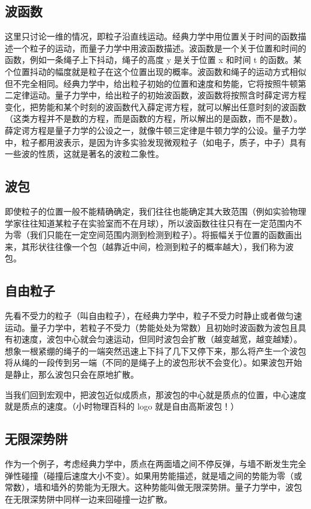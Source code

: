 ﻿\subsection{波函数}
这里只讨论一维的情况，即粒子沿直线运动。经典力学中用位置关于时间的函数描述一个粒子的运动，而量子力学中用波函数描述。波函数是一个关于位置和时间的函数，例如一条绳子上下抖动，绳子的高度 y 是关于位置 x 和时间 t 的函数。某个位置抖动的幅度就是粒子在这个位置出现的概率。波函数和绳子的运动方式相似但不完全相同。经典力学中，给出粒子初始的位置和速度和势能，它将按照牛顿第二定律运动。量子力学中，给出粒子的初始波函数，波函数将按照含时薛定谔方程变化，把势能和某个时刻的波函数代入薛定谔方程，就可以解出任意时刻的波函数（这类方程并不是数的方程，而是函数的方程，所以解出的是函数，而不是数）。薛定谔方程是量子力学的公设之一，就像牛顿三定律是牛顿力学的公设。量子力学中，粒子都用波表示，是因为许多实验发现微观粒子（如电子，质子，中子）具有一些波的性质，这就是著名的波粒二象性。

\subsection{波包}
即使粒子的位置一般不能精确确定，我们往往也能确定其大致范围（例如实验物理学家往往知道某粒子在实验室而不在月球），所以波函数往往只有在一定范围内不为零（我们只能在一定空间范围内测到检测到粒子）。将振幅关于位置的函数画出来，其形状往往像一个包（越靠近中间，检测到粒子的概率越大），我们称为波包。

\subsection{自由粒子}
先看不受力的粒子（叫自由粒子），在经典力学中，粒子不受力时静止或者做匀速运动。量子力学中，若粒子不受力（势能处处为常数）且初始时波函数为波包且具有初速度，波包中心就会匀速运动，但同时波包会扩散（越变越宽，越变越矮）。想象一根紧绷的绳子的一端突然迅速上下抖了几下又停下来，那么将产生一个波包将从绳的一段传到另一端（不同的是绳子上的波包形状不会变化）。如果波包开始是静止，那么波包只会在原地扩散。

当我们回到宏观中，把波包近似成质点，那波包的中心就是质点的位置，中心速度就是质点的速度。（小时物理百科的 logo 就是自由高斯波包！）

\subsection{无限深势阱}
作为一个例子，考虑经典力学中，质点在两面墙之间不停反弹，与墙不断发生完全弹性碰撞（碰撞后速度大小不变）。如果用势能描述，就是墙之间的势能为零（或常数），墙和墙外的势能为无限大。这种势能叫做无限深势阱。量子力学中，波包在无限深势阱中同样一边来回碰撞一边扩散。


